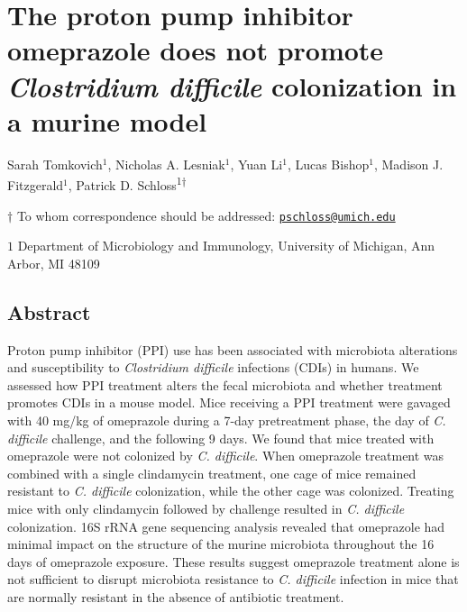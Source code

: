 \documentclass[11pt,]{article}
\title{}
\author{}
\date{}
\begin{document}
\vspace{35mm}

\section{\texorpdfstring{The proton pump inhibitor omeprazole does not
promote \emph{Clostridium difficile} colonization in a murine
model}{The proton pump inhibitor omeprazole does not promote Clostridium difficile colonization in a murine model}}\label{the-proton-pump-inhibitor-omeprazole-does-not-promote-clostridium-difficile-colonization-in-a-murine-model}

\vspace{35mm}

Sarah Tomkovich\({^1}\), Nicholas A. Lesniak\({^1}\), Yuan Li\({^1}\),
Lucas Bishop\({^1}\), Madison J. Fitzgerald\({^1}\), Patrick D.
Schloss\textsuperscript{1\(\dagger\)}

\vspace{40mm}

\(\dagger\) To whom correspondence should be addressed:
\href{mailto:pschloss@umich.edu}{\nolinkurl{pschloss@umich.edu}}

\(1\) Department of Microbiology and Immunology, University of Michigan,
Ann Arbor, MI 48109

\newpage

\linenumbers

\subsection{Abstract}\label{abstract}

Proton pump inhibitor (PPI) use has been associated with microbiota
alterations and susceptibility to \emph{Clostridium difficile}
infections (CDIs) in humans. We assessed how PPI treatment alters the
fecal microbiota and whether treatment promotes CDIs in a mouse model.
Mice receiving a PPI treatment were gavaged with 40 mg/kg of omeprazole
during a 7-day pretreatment phase, the day of \emph{C. difficile}
challenge, and the following 9 days. We found that mice treated with
omeprazole were not colonized by \emph{C. difficile}. When omeprazole
treatment was combined with a single clindamycin treatment, one cage of
mice remained resistant to \emph{C. difficile} colonization, while the
other cage was colonized. Treating mice with only clindamycin followed
by challenge resulted in \emph{C. difficile} colonization. 16S rRNA gene
sequencing analysis revealed that omeprazole had minimal impact on the
structure of the murine microbiota throughout the 16 days of omeprazole
exposure. These results suggest omeprazole treatment alone is not
sufficient to disrupt microbiota resistance to \emph{C. difficile}
infection in mice that are normally resistant in the absence of
antibiotic treatment.
\end{document}
